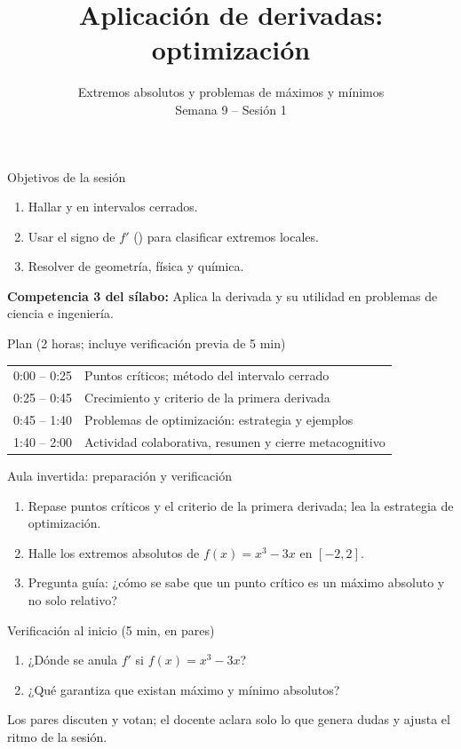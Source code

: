 \documentclass[10pt,aspectratio=169]{beamer}
\title[Optimización]{Aplicación de derivadas: optimización}
\subtitle{Extremos absolutos y problemas de máximos y mínimos\\[2pt]\small Semana 9 -- Sesión 1}
\begin{document}
\begin{frame}
  \titlepage
\end{frame}

\begin{frame}{Objetivos de la sesión}
  \begin{enumerate}
    \item Hallar  y  en intervalos cerrados.
    \item Usar el signo de $f'$ () para clasificar extremos locales.
    \item Resolver  de geometría, física y química.
  \end{enumerate}
  \vspace{1mm}
  {\small\textbf{Competencia 3 del sílabo:} Aplica la derivada y su utilidad en problemas de ciencia e ingeniería.}
  \begin{block}{Plan (2 horas; incluye verificación previa de 5 min)}
    \begin{tabular}{ll}
      0:00 -- 0:25 & Puntos críticos; método del intervalo cerrado\\
      0:25 -- 0:45 & Crecimiento y criterio de la primera derivada\\
      0:45 -- 1:40 & Problemas de optimización: estrategia y ejemplos\\
      1:40 -- 2:00 & Actividad colaborativa, resumen y cierre metacognitivo
    \end{tabular}
  \end{block}
\end{frame}

\begin{frame}{Aula invertida: preparación y verificación}
  \small
  \begin{previa}
    \begin{enumerate}
      \item Repase puntos críticos y el criterio de la primera derivada; lea la estrategia de optimización.
      \item Halle los extremos absolutos de $f(x)=x^3-3x$ en $[-2,2]$.
      \item Pregunta guía: ¿cómo se sabe que un punto crítico es un máximo absoluto y no solo relativo?
    \end{enumerate}
  \end{previa}
  \begin{block}{Verificación al inicio (5 min, en pares)}
    \begin{enumerate}
      \item ¿Dónde se anula $f'$ si $f(x)=x^3-3x$?
      \item ¿Qué garantiza que existan máximo y mínimo absolutos?
    \end{enumerate}
    Los pares discuten y votan; el docente aclara solo lo que genera dudas y ajusta el ritmo de la sesión.
  \end{block}
\end{frame}
\end{document}
